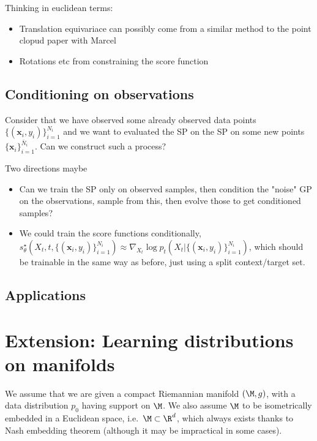 Thinking in euclidean terms:
\begin{itemize}
    \item Translation equivariace can possibly come from a similar method to the point clopud paper with Marcel
    \item Rotations etc from constraining the score function
\end{itemize}

\subsection{Conditioning on observations}

Consider that we have observed some already observed data points $\{(\mathbf{x}_i, y_i)\}_{i=1}^{N_i}$ and we want to evaluated the SP on the
SP on some new points $\{ \mathbf{x}_i \}_{i=1}^{\bar{N}_i}$. Can we construct such a process?

Two directions maybe
\begin{itemize}
    \item Can we train the SP only on observed samples, then condition the "noise" GP on the observations, sample from this, then evolve those to get conditioned samples?
    \item We could train the score functions conditionally, $s_\theta^\star(X_t, t, \{(\mathbf{x}_i, y_i)\}_{i=1}^{N_i}) \approx \nabla_{X_t} \log p_t(X_t | \{(\mathbf{x}_i, y_i)\}_{i=1}^{N_i})$, which should be trainable in the same way as before, just using a split context/target set.
\end{itemize}


\subsection{Applications}
\cite{dupont2021Generative}




\section{Extension: Learning distributions on manifolds}
We assume that we are given a compact Riemannian manifold $(\M, g)$, with a data distribution $p_0$ having support on $\M$.
We also assume $\M$ to be isometrically embedded in a Euclidean space, i.e.\ $\M \subset \R^d$, which always exists thanks to Nash embedding theorem (although it may be impractical in some cases).

